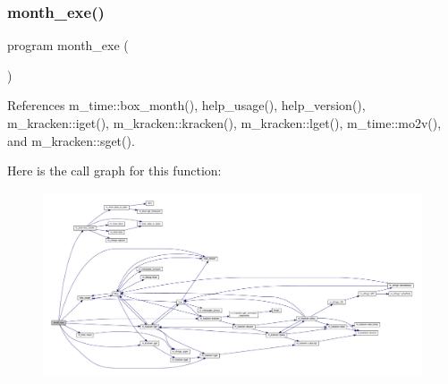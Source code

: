 \subsubsection{\texorpdfstring{month\+\_\+exe()}{month\_exe()}}
{\footnotesize\ttfamily program month\+\_\+exe (\begin{DoxyParamCaption}{ }\end{DoxyParamCaption})}



References m\+\_\+time\+::box\+\_\+month(), help\+\_\+usage(), help\+\_\+version(), m\+\_\+kracken\+::iget(), m\+\_\+kracken\+::kracken(), m\+\_\+kracken\+::lget(), m\+\_\+time\+::mo2v(), and m\+\_\+kracken\+::sget().

Here is the call graph for this function\+:
\nopagebreak
\begin{figure}[H]
\begin{center}
\leavevmode
\includegraphics[width=350pt]{month_8f90_a25f7e0d0c91977505b956237e747f2bb_cgraph}
\end{center}
\end{figure}
